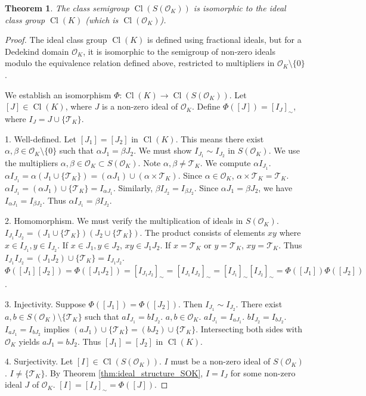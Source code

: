 \documentclass[11pt, a4paper]{article}
\theoremstyle{plain}
\newtheorem{theorem}{Theorem}[section]
\theoremstyle{definition}
\numberwithin{equation}{section}
\newcommand{\Tobj}{\mathcal{T}} %
\DeclareMathOperator{\Cl}{Cl}
\newcommand{\OK}{\mathcal{O}_K}
\newcommand{\SOK}{S(\OK)}
\begin{document}
\begin{theorem}\label{thm:class_semigroup_SOK}
The class semigroup $\Cl(\SOK)$ is isomorphic to the ideal class group $\Cl(K)$ (which is $\Cl(\OK)$).
\end{theorem}
\begin{proof}
The ideal class group $\Cl(K)$ is defined using fractional ideals, but for a Dedekind domain $\OK$, it is isomorphic to the semigroup of non-zero ideals modulo the equivalence relation defined above, restricted to multipliers in $\OK\setminus\{0\}$.

We establish an isomorphism $\Phi: \Cl(K) \to \Cl(\SOK)$.
Let $[J] \in \Cl(K)$, where $J$ is a non-zero ideal of $\OK$. Define $\Phi([J]) = [I_J]_{\sim}$, where $I_J=J\cup\{\Tobj_K\}$.

1. Well-defined. Let $[J_1]=[J_2]$ in $\Cl(K)$. This means there exist $\alpha, \beta \in \OK\setminus\{0\}$ such that $\alpha J_1 = \beta J_2$.
We must show $I_{J_1} \sim I_{J_2}$ in $\SOK$. We use the multipliers $\alpha, \beta \in \OK \subset \SOK$. Note $\alpha, \beta \neq \Tobj_K$.
We compute $\alpha I_{J_1}$. $\alpha I_{J_1} = \alpha (J_1 \cup \{\Tobj_K\}) = (\alpha J_1) \cup (\alpha\times\Tobj_K)$.
Since $\alpha \in \OK$, $\alpha\times\Tobj_K = \Tobj_K$.
$\alpha I_{J_1} = (\alpha J_1) \cup \{\Tobj_K\} = I_{\alpha J_1}$.
Similarly, $\beta I_{J_2} = I_{\beta J_2}$.
Since $\alpha J_1 = \beta J_2$, we have $I_{\alpha J_1} = I_{\beta J_2}$. Thus $\alpha I_{J_1} = \beta I_{J_2}$.

2. Homomorphism. We must verify the multiplication of ideals in $\SOK$.
$I_{J_1} I_{J_2} = (J_1\cup\{\Tobj_K\})(J_2\cup\{\Tobj_K\})$.
The product consists of elements $xy$ where $x \in I_{J_1}, y \in I_{J_2}$.
If $x \in J_1, y \in J_2$, $xy \in J_1 J_2$.
If $x=\Tobj_K$ or $y=\Tobj_K$, $xy=\Tobj_K$.
Thus $I_{J_1} I_{J_2} = (J_1 J_2) \cup \{\Tobj_K\} = I_{J_1 J_2}$.
$\Phi([J_1][J_2]) = \Phi([J_1 J_2]) = [I_{J_1 J_2}]_{\sim} = [I_{J_1} I_{J_2}]_{\sim} = [I_{J_1}]_{\sim} [I_{J_2}]_{\sim} = \Phi([J_1])\Phi([J_2])$.

3. Injectivity. Suppose $\Phi([J_1])=\Phi([J_2])$. Then $I_{J_1} \sim I_{J_2}$.
There exist $a, b \in \SOK\setminus\{\Tobj_K\}$ such that $a I_{J_1} = b I_{J_2}$.
$a, b \in \OK$.
$a I_{J_1} = I_{a J_1}$. $b I_{J_2} = I_{b J_2}$.
$I_{a J_1} = I_{b J_2}$ implies $(a J_1) \cup \{\Tobj_K\} = (b J_2) \cup \{\Tobj_K\}$.
Intersecting both sides with $\OK$ yields $a J_1 = b J_2$. Thus $[J_1]=[J_2]$ in $\Cl(K)$.

4. Surjectivity. Let $[I] \in \Cl(\SOK)$. $I$ must be a non-zero ideal of $\SOK$. $I \neq \{\Tobj_K\}$. By Theorem \ref{thm:ideal_structure_SOK}, $I=I_J$ for some non-zero ideal $J$ of $\OK$. $[I] = [I_J]_{\sim} = \Phi([J])$.
\end{proof}
\end{document}
